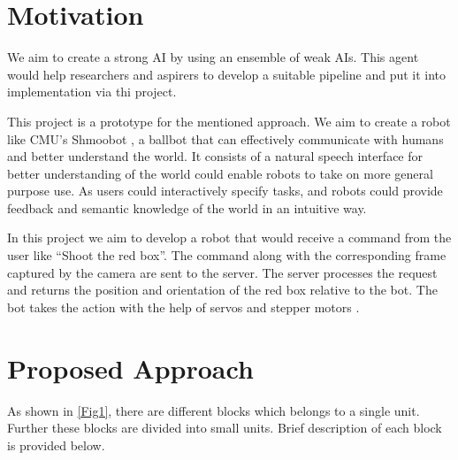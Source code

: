 \documentclass{article}
\begin{document}
	\section{Motivation}
We aim to create a strong AI by using an ensemble of weak AIs. This agent would help researchers and aspirers to develop a suitable pipeline and put it into implementation via thi project.

This project is a prototype for the mentioned approach. We aim to create a robot like CMU’s Shmoobot \cite{shmoo}, a ballbot that can effectively communicate with humans and better understand the world. It consists of a natural speech interface for better understanding of the world could enable robots to take on more general purpose use. As users could interactively specify tasks, and robots could provide feedback and semantic knowledge of the world in an intuitive way.

In this project we aim to develop a robot that would receive a command from the user like “Shoot the red box”. The command along with the corresponding frame captured by the camera are sent to the server. The server processes the request and returns the position and orientation of the red box relative to the bot. The bot takes the action with the help of servos and stepper motors \cite{bot}.

	\section{Proposed Approach}
As shown in \ref{Fig1}, there are different blocks which belongs to a single unit. Further these blocks are divided into small units. Brief description of each block is provided below.
\end{document}
